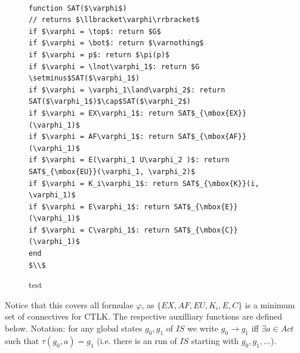 \documentclass[11pt]{report}
\begin{document}
\begin{figure}

\begin{lstlisting}[mathescape]

function SAT($\varphi$) 
// returns $\llbracket\varphi\rrbracket$
if $\varphi = \top$: return $G$
if $\varphi = \bot$: return $\varnothing$
if $\varphi = p$: return $\pi(p)$ 
if $\varphi = \lnot\varphi_1$: return $G \setminus$SAT($\varphi_1$)
if $\varphi = \varphi_1\land\varphi_2$: return SAT($\varphi_1$)$\cap$SAT($\varphi_2$)
if $\varphi = EX\varphi_1$: return SAT$_{\mbox{EX}}(\varphi_1)$
if $\varphi = AF\varphi_1$: return SAT$_{\mbox{AF}}(\varphi_1)$
if $\varphi = E(\varphi_1 U\varphi_2 )$: return SAT$_{\mbox{EU}}(\varphi_1, \varphi_2)$
if $\varphi = K_i\varphi_1$: return SAT$_{\mbox{K}}(i, \varphi_1)$
if $\varphi = E\varphi_1$: return SAT$_{\mbox{E}}(\varphi_1)$
if $\varphi = C\varphi_1$: return SAT$_{\mbox{C}}(\varphi_1)$
end
$\\$
\end{lstlisting}
\caption{test}
\label{algo}
\end{figure}
Notice that this covers all formulae $\varphi$, as $\{EX, AF, EU, K_i, E, C\}$ is a minimum set of connectives for CTLK. The respective auxilliary functions are defined below. Notation: for any global states $g_0, g_1$ of $IS$ we write $g_0 \rightarrow g_1$ iff $\exists a \in Act$ such that $\tau(g_0, a) = g_1$ (i.e. there is an run of $IS$ starting with $g_0, g_1, ...$).
\end{document}
